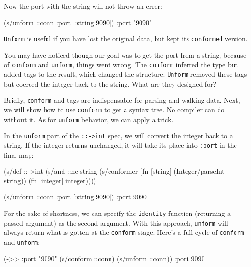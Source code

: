 \noindent
Now the port with the string will not throw an error:

\begin{english}
  \begin{clojure}
(s/unform ::conn {:port [:string 9090]})
{:port "9090"}
  \end{clojure}
\end{english}

\verb|Unform| is useful if you have lost the original data, but kept its \verb|conformed| version.

You may have noticed though our goal was to get the port from a string, because of \verb|conform| and \verb|unform|, things went wrong. The \verb|conform| inferred the type but added tags to the result, which changed the structure. \verb|Unform| removed these tags but coerced the integer back to the string. What are they designed for?

Briefly, \verb|conform| and tags are indispensable for parsing and walking data. Next, we will show how to use \verb|conform| to get a syntax tree. No compiler can do without it. As for \verb|unform| behavior, we can apply a trick.

In the \verb|unform| part of the \verb|::->int| spec, we will convert the integer back to a string. If the integer returns unchanged, it will take its place into \verb|:port| in the final map:

\begin{english}
  \begin{clojure}
(s/def ::->int
  (s/and
   ::ne-string
   (s/conformer
    (fn [string]
      (Integer/parseInt string))
    (fn [integer]
      integer))))

(s/unform ::conn {:port [:string 9090]})
{:port 9090}
  \end{clojure}
\end{english}


For the sake of shortness, we can specify the \verb|identity| function (returning a passed argument) as the second argument.  With this approach, \verb|unform| will always return what is gotten at the \verb|conform| stage. Here's a full cycle of \verb|conform| and \verb|unform|:

\begin{english}
  \begin{clojure}
(->> {:port "9090"}
     (s/conform ::conn)
     (s/unform ::conn))
{:port 9090}
  \end{clojure}
\end{english}

